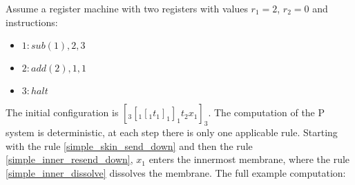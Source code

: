     \begin{example}
      Assume a register machine with two registers with values $r_1=2$, $r_2=0$ and instructions:
      \begin{itemize}
        \item $1: sub(1),2,3$
        \item $2: add(2),1,1$
        \item $3: halt$
      \end{itemize}

      The initial configuration is $[_3 [_1 [_1 t_1 ]_1 ]_1 t_2 x_1 ]_3$. The computation of the P system is deterministic, at each step there is only one applicable rule. Starting with the rule \ref{simple_skin_send_down} and then the rule \ref{simple_inner_resend_down}, $x_1$ enters the innermost membrane, where the rule \ref{simple_inner_dissolve} dissolves the membrane. The full example computation:


\end{example}
